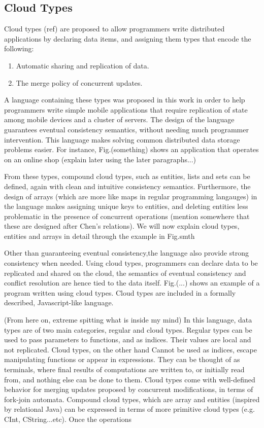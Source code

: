 \subsection{Cloud Types}
Cloud types (ref) are proposed to allow programmers write distributed applications by
declaring data items, and assigning them types that encode the following:
\begin{enumerate}
  \item Automatic sharing and replication of data.
  \item The merge policy of concurrent updates.
\end{enumerate}
A language containing these types was proposed in this work in order to help programmers
write simple mobile applications that require replication of state among mobile
devices and a cluster of servers. The design of the language guarantees eventual
consistency semantics, without needing much programmer intervention. This
language makes solving common distributed data storage problems easier. For
instance, Fig.(something) shows an application that operates on an online shop
(explain later using the later paragraphs...)

From these types, compound cloud types, such as entities,
lists and sets can be defined, again with clean and intuitive consistency
semantics. Furthermore, the design of arrays (which are more like maps in
regular programming langauges) in the language makes assigning
unique keys to entities, and deleting entities less problematic in the presence
of concurrent operations (mention somewhere that these are designed after Chen's
relations). We will now explain cloud types, entities and arrays in detail through
the example in Fig.smth

Other than guaranteeing eventual consistency,the language also provide strong consistency
when needed. Using cloud types, programmers can declare data to be replicated
and shared on the cloud, the semantics of eventual consistency and conflict
resolution are hence tied to the data itself. Fig.(...) shows an example of a
program written using cloud types. Cloud types are included in a formally
described, Javascript-like language.

(From here on, extreme spitting what is inside my mind)
In this language, data types are of two main categories, regular and cloud
types. Regular types can be used to pass parameters to functions, and as
indices. Their values are local and not replicated. Cloud types, on the other
hand Cannot be used as indices, escape manipulating functions or appear in
expressions. They can be thought of as terminals, where final results of
computations are written to, or initially read from, and nothing else can be done
to them. Cloud types come with well-defined behavior for merging updates
proposed by concurrent modifications, in terms of fork-join automata. Compound
cloud types, which are array and entities (inspired by relational Java) can be
expressed in terms of more primitive cloud types (e.g. CInt, CString...etc).
Once the operations

